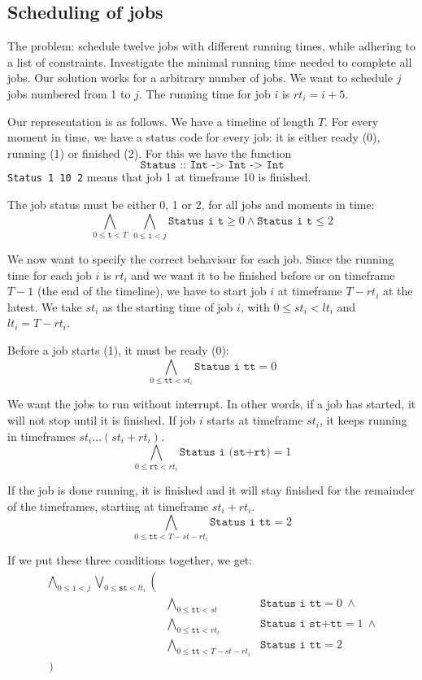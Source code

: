 \documentclass[12pt]{article}
\begin{document}
\subsection*{Scheduling of jobs}
The problem: schedule twelve jobs with different running times, while adhering to a list of constraints.
Investigate the minimal running time needed to complete all jobs.
Our solution works for a arbitrary number of jobs.
We want to schedule $j$ jobs numbered from 1 to $j$.
The running time for job $i$ is $rt_i = i+5$.

Our representation is as follows.
We have a timeline of length $T$.
For every moment in time, we have a status code for every job: it is either ready (0), running (1) or finished (2). 
For this we have the function 
\[\texttt{Status :: Int -> Int -> Int}\]
\texttt{Status 1 10 2} means that job 1 at timeframe 10 is finished. 

The job status must be either 0, 1 or 2, for all jobs and moments in time:
\[ \bigwedge_{0 \le \texttt{t} < T} ~ \bigwedge_{0 \le \texttt{i} < j} \texttt{Status i t} \ge 0\wedge \texttt{Status i t} \le 2\]

We now want to specify the correct behaviour for each job. 
Since the running time for each job $i$ is $rt_i$ and we want it to be finished before or on timeframe $T-1$ (the end of the timeline), we have to start job $i$ at timeframe $T - rt_i$ at the latest.
We take $st_i$ as the starting time of job $i$, with $0 \le st_i < lt_i$ and $lt_i = T-rt_i$.

Before a job starts (1), it must be ready (0):
\[ \bigwedge_{0 \le \texttt{tt} < st_i} \texttt{Status i tt} = 0 \]

We want the jobs to run without interrupt.
In other words, if a job has started, it will not stop until it is finished. 
If job $i$ starts at timeframe $st_i$, it keeps running in timeframes $st_i \dots (st_i + rt_i)$.
\[ \bigwedge_{0 \le \texttt{rt} < rt_i} \texttt{Status i (st+rt)} = 1 \]

If the job is done running, it is finished and it will stay finished for the remainder of the timeframes, starting at timeframe $st_i + rt_i$.
\[ \bigwedge_{0 \le \texttt{tt} < T-st-rt_i} \texttt{Status i tt} = 2 \]

If we put these three conditions together, we get:
\[ \begin{array}{rll}
    \bigwedge_{0 \le \texttt{i} < j} \bigvee_{0 \le \texttt{st} < lt_i} \left( \right.&& \\
    & \bigwedge_{0 \le \texttt{tt} < st} & \texttt{Status i tt} = 0 ~ \wedge \\
    & \bigwedge_{0 \le \texttt{tt} < rt_i} & \texttt{Status i st+tt} = 1 ~ \wedge \\
    & \bigwedge_{0 \le \texttt{tt} < T-st-rt_i} & \texttt{Status i tt} = 2 \\
\left. \right)
\end{array} \]
\end{document}
